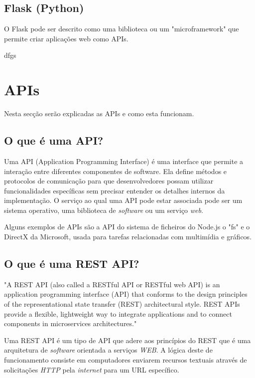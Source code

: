 \subsection{Flask (Python)}

O Flask pode ser descrito como uma biblioteca ou um "microframework" que permite 
criar aplicações web como APIs.

dfgs

\section{APIs}

Nesta secção serão explicadas as APIs e como esta funcionam.


\subsection{O que é uma API?}

Uma API (Application Programming Interface) é uma interface que permite a interação entre diferentes componentes de software. 
Ela define métodos e protocolos de comunicação para que desenvolvedores possam utilizar 
funcionalidades específicas sem precisar entender os detalhes internos da implementação.
O serviço ao qual uma API pode estar associada pode ser um sistema operativo, uma biblioteca
de \textit{software} ou um serviço \textit{web}.

Alguns exemplos de APIs são a API do sistema de ficheiros do Node.js o "fs" e o DirectX 
da Microsoft, usada para tarefas relacionadas com multimídia e gráficos.

\subsection{O que é uma REST API?}


"A REST API (also called a RESTful API or RESTful web API) is an application 
programming interface (API) that conforms to the design principles of the representational
state transfer (REST) architectural style. REST APIs provide a flexible, lightweight way 
to integrate applications and to connect components in microservices architectures." \cite{ibmrestapi}



Uma REST API é um tipo de API que adere aos princípios do REST que é uma arquitetura
de \textit{software} orientada a serviços \textit{WEB}.
A lógica deste de funcionamento consiste em computadores enviarem recursos textuais através
de solicitações \textit{HTTP} pela \textit{internet} para um URL específico. \\

